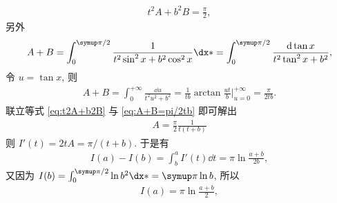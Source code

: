 \begin{exercise}[resume=exer]
\begin{answer}
\begin{align}
              t^{2}A + b^{2}B = \frac{\pi}{2},
          \end{align}
          另外
          \begin{align*}
              A + B = \int_{0}^{\pi/2} \frac{1}{t^{2}\sin^{2}x + b^{2}\cos^{2}x} \dx* = \int_{0}^{\pi/2} \frac{\dd\tan x}{t^{2}\tan^{2}x + b^{2}},
          \end{align*}
          令 $ u = \tan x $, 则
          \begin{align}\label{eq:A+B=pi/2tb}
              A + B = \int_{0}^{+\infty} \frac{\dd u}{t^{2}u^{2} + b^{2}} = \frac{1}{tb}\arctan\frac{ut}{b}\bigg|_{u = 0}^{+\infty } = \frac{\pi}{2tb}.
          \end{align}
          联立等式 \eqref{eq:t2A+b2B} 与 \eqref{eq:A+B=pi/2tb} 即可解出
          \begin{align*}
              A = \frac{\pi}{2}\frac{1}{t(t + b)}
          \end{align*}
          则 $ I'(t) = 2tA = \pi/(t + b) $. 于是有
          \begin{align*}
              I(a) - I(b) = \int_{b}^{a} I'(t) \dd{t} = \pi\ln\frac{a + b}{2b},
          \end{align*}
          又因为 $ I(b) = \int_{0}^{\pi/2}\ln b^{2} \dx* = \pi\ln b $, 所以
          \begin{align*}
              I(a) = \pi\ln\frac{a + b}{2},
          \end{align*}


\end{answer}
\end{exercise}
